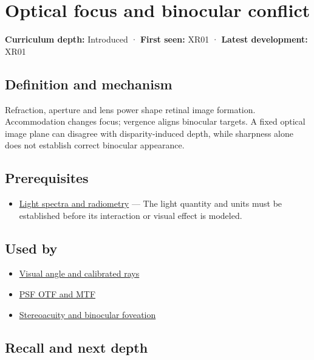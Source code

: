\hypertarget{appendix-f90cee1be7a4}{}
\section{Optical focus and binocular conflict}\label{appendix-f90cee1be7a4-optical-focus-and-binocular-conflict}

\textbf{Curriculum depth:} Introduced · \textbf{First seen:} XR01 · \textbf{Latest development:} XR01

\subsection{Definition and mechanism}\label{appendix-f90cee1be7a4-definition-and-mechanism}

Refraction, aperture and lens power shape retinal image formation. Accommodation changes focus; vergence aligns binocular targets. A fixed optical image plane can disagree with disparity-induced depth, while sharpness alone does not establish correct binocular appearance.

\subsection{Prerequisites}\label{appendix-f90cee1be7a4-prerequisites}

\begin{itemize}
\tightlist
\item
  \hyperref[appendix-215c2570199b]{Light spectra and radiometry} --- The light quantity and units must be established before its interaction or visual effect is modeled.
\end{itemize}

\subsection{Used by}\label{appendix-f90cee1be7a4-used-by}

\begin{itemize}
\tightlist
\item
  \hyperref[appendix-7d356c396d1a]{Visual angle and calibrated rays}
\item
  \hyperref[appendix-8b76b0efd27f]{PSF OTF and MTF}
\item
  \hyperref[appendix-8dc848f14052]{Stereoacuity and binocular foveation}
\end{itemize}

\subsection{Recall and next depth}\label{appendix-f90cee1be7a4-recall-and-next-depth}

